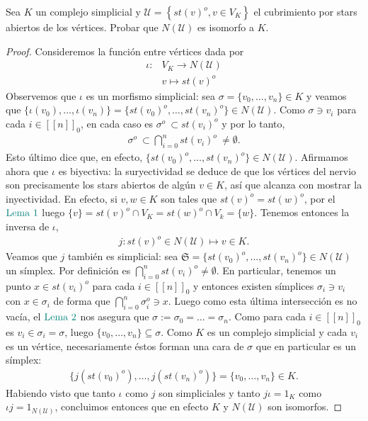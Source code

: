 \documentclass[11pt]{article}
\newcommand{\tint}[1]{#1^o}%
\newcommand{\nat}[1]{[\![#1]\!]}
\newcommand{\natzero}[1]{\nat{#1}_0}
\newcommand{\paint}[2]{\color{#1}{#2}}
\newenvironment{exercise}[2][Ejercicio]{\begin{trivlist}
\item[\hskip \labelsep \paint{grey-light-blue}{{\bfseries #1}}\hskip \labelsep {\bfseries #2.}]}{\end{trivlist}}
\begin{document}
\begin{exercise}{4} Sea $K$ un complejo simplicial y $\mathcal{U} = \left\{\tint{st(v)}, v \in V_K\right\}$ el cubrimiento por stars abiertos de los v\'ertices. Probar que $N(\mathcal{U})$ es isomorfo a $K$.
\end{exercise}
\begin{proof} Consideremos la funci\'on entre v\'ertices dada por
\begin{align*}
\iota : &V_K \to N(\mathcal{U}) \\
& v \longmapsto \tint{st(v)}
\end{align*}
Observemos que $\iota$ es un morfismo simplicial: sea $\sigma = \{v_0, \dots, v_n \}\in K$ y veamos que $\{\iota(v_0), \dots, \iota(v_n)\} = \{\tint{st(v_0)}, \dots, \tint{st(v_n)}\} \in N(\mathcal{U})$. Como $\sigma \ni v_i$ para cada $i \in \natzero{n}$, en cada caso es $\tint{\sigma} \ \subset \tint{st(v_i)}$ y por lo tanto,
\begin{align*}
\tint{\sigma} \ \subset \bigcap_{i=0}^n\tint{st(v_i)} \ \neq \emptyset.
\end{align*}
Esto \'ultimo dice que, en efecto, $\{\tint{st(v_0)}, \dots, \tint{st(v_n)}\} \in N(\mathcal{U})$. Afirmamos ahora que $\iota$ es biyectiva: la suryectividad se deduce de que los v\'ertices del nervio son precisamente los stars abiertos de alg\'un $v \in K$, as\'i que alcanza con mostrar la inyectividad. En efecto, si $v, w \in K$ son tales que $\tint{st(v)} = \tint{st(w)}$, por el $\paint{grey-light-blue}{\text{Lema }1}$ luego $\{v\} = \tint{st(v)} \cap V_K = \tint{st(w)} \cap V_k = \{w\}$. Tenemos entonces la inversa de $\iota$,
\begin{align*}
j : \tint{st(v)} \in N(\mathcal{U}) \mapsto v \in K.
\end{align*}
Veamos que $j$ tambi\'en es simplicial: sea $\mathfrak{S} = \{\tint{st(v_0)}, \dots, \tint{st(v_n)} \} \in N(\mathcal{U})$ un s\'implex. Por definici\'on es $\bigcap_{i=0}^n\tint{st(v_i)} \neq \emptyset$. En particular, tenemos un punto $x \in \tint{st(v_i)}$ para cada $i \in \natzero{n}$ y entonces existen s\'implices $\sigma_i \ni v_i$ con $x \in \sigma_i$ de forma que $\bigcap_{i=0}^n\tint{\sigma_i} \ni x$. Luego como esta \'ultima intersecci\'on es no vac\'ia, el $\paint{grey-light-blue}{\text{Lema }2}$ nos asegura que $\sigma := \sigma_0 = \dots = \sigma_n$. Como para cada $i \in \natzero{n}$ es $v_i \in \sigma_i = \sigma$, luego $\{v_0, \dots, v_n\} \subseteq \sigma$. Como $K$ es un complejo simplicial y cada $v_i$ es un v\'ertice, necesariamente \'estos forman una cara de $\sigma$ que en particular es un s\'implex:
\begin{align*}
\{j(\tint{st(v_0)}), \dots, j(\tint{st(v_n)})\} = \{v_0, \dots, v_n \} \in K.
\end{align*}
Habiendo visto que tanto $\iota$ como $j$ son simpliciales y tanto $j\iota = 1_K$ como $\iota j = 1_{N(\mathcal{U})}$, concluimos entonces que en efecto $K$ y $N(\mathcal{U})$ son isomorfos.
\end{proof}
\end{document}
